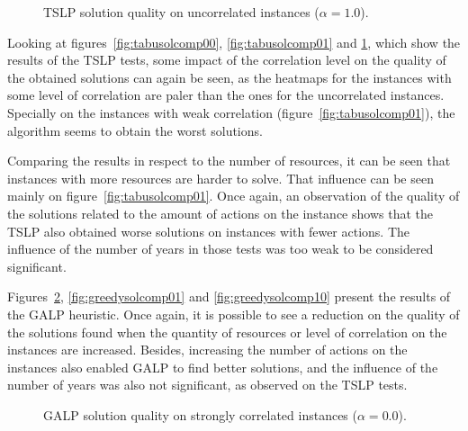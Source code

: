 \figspaces
\begin{figure}[H]
  \centering
  \resizebox{\columnwidth}{!}{%
    \subfloat[1 resource]{} 
    \subfloat[2 resources]{}
    \subfloat[4 resources]{}
  }
  \caption{TSLP solution quality on uncorrelated instances ($\alpha = 1.0$).}
  \label{fig:tabusolcomp10}
\end{figure}

Looking at figures~\ref{fig:tabusolcomp00}, \ref{fig:tabusolcomp01} and \ref{fig:tabusolcomp10}, which show the results of the TSLP tests, some impact of
the correlation level on the quality of the obtained solutions can again be seen, as the heatmaps for the instances with some level of correlation
are paler than the ones for the uncorrelated instances. Specially on the instances with weak correlation (figure~\ref{fig:tabusolcomp01}), the algorithm seems
to obtain the worst solutions.

Comparing the results in respect to the number of resources, it can be seen that instances with more resources are harder to solve. That influence
can be seen mainly on figure~\ref{fig:tabusolcomp01}. Once again, an observation of the quality of the solutions related to the amount of actions on the instance
shows that the TSLP also obtained worse solutions on instances with fewer actions. The influence of the number of years in those tests was too weak to be 
considered significant.

Figures~\ref{fig:greedysolcomp00}, \ref{fig:greedysolcomp01} and \ref{fig:greedysolcomp10} present the results of the GALP heuristic.
Once again, it is possible to see a reduction on the quality of the solutions found when the quantity of resources or level of correlation on
the instances are increased. Besides, increasing the number of actions on the instances also enabled GALP to find better solutions, and
the influence of the number of years was also not significant, as observed on the TSLP tests.

\figpar
\begin{figure}[H]
  \centering
  \resizebox{\columnwidth}{!}{%
    \subfloat[1 resource]{} 
    \subfloat[2 resources]{}
    \subfloat[4 resources]{} 
  }
  \caption{GALP solution quality on strongly correlated instances ($\alpha = 0.0$).}
  \label{fig:greedysolcomp00}
\end{figure}


